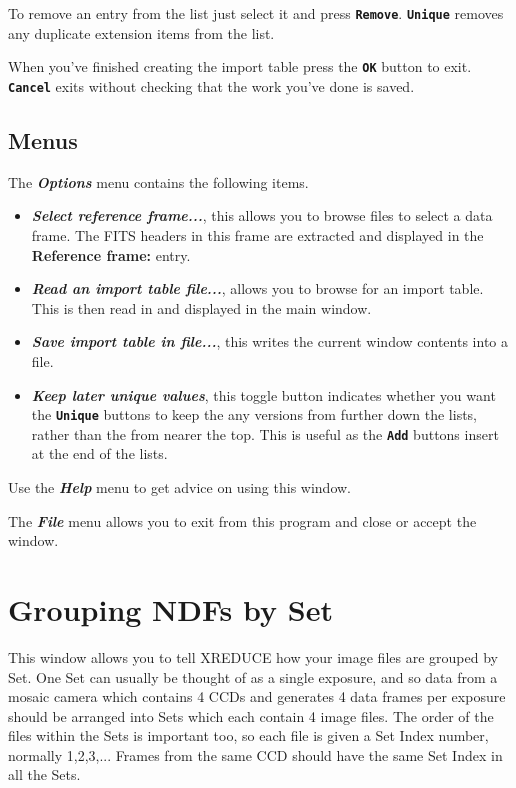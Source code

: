 \documentclass[11pt,nolof]{starlink}
\providecommand{\butt}[1]{{\bf \tt #1}}
\providecommand{\menu}[1]{{\bf \em #1}}
\providecommand{\wlab}[1]{{\bf #1}}
\begin{document}
To remove an entry from the list just select it and press
\butt{Remove}. \butt{Unique} removes any duplicate extension items
from the list.


When you've finished creating the
import table press the \butt{OK} button to exit. \butt{Cancel} exits
without checking that the work you've done is saved.


\subsection{Menus }
The \menu{Options} menu contains the following items.
\begin{itemize}
\item \menu{Select reference frame...}, this allows you to browse files
to select a data frame. The FITS headers in this frame are extracted
and displayed in the \wlab{Reference frame:} entry.
\item \menu{Read an import table file...}, allows you to browse for an
import table. This is then read in and displayed in the main window.
\item \menu{Save import table in file...}, this writes the current
window contents into a file.
\item \menu{Keep later unique values}, this toggle button indicates
whether you want the \butt{Unique} buttons to keep the any versions from
further down the lists, rather than the from nearer the top. This is
useful as the \butt{Add} buttons insert at the end of the lists.
\end{itemize}

Use the \menu{Help} menu to get advice on using this window.

The \menu{File} menu allows you to exit from this program and close or
accept the window.

\section{Grouping NDFs by Set }

This window allows you to tell XREDUCE how your image files are
grouped by Set.
One Set can usually be thought of as a single exposure,
and so data from a mosaic camera which contains 4 CCDs and generates
4 data frames per exposure should be arranged into Sets which each
contain 4 image files.  The order of the files within the Sets is
important too, so each file is given a Set Index number, normally 1,2,3,...
Frames from the same CCD should have the same Set Index in all the Sets.
\end{document}
